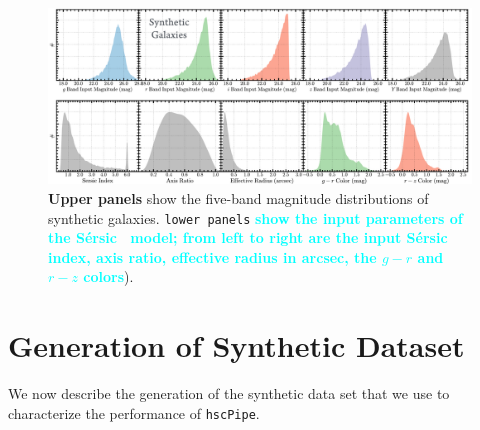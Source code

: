 \documentclass[useamsfonts]{pasj01}
\def\ser{{S\'{e}rsic\ }}
\def\hscpipe{\texttt{hscPipe}}
\newcommand{\song}[1]{\textcolor{cyan} {\textbf{#1}}}
\begin{document}
\begin{figure}
    \begin{center}
        \includegraphics[width=\textwidth]{fig/synpipe_galaxy_sample}
    \end{center}
    \caption{
         \textbf{Upper panels} show the five-band magnitude distributions of synthetic
         galaxies. \texttt{lower panels} \song{
         show the \textbf{input} parameters of the \ser{} 
         model; from left to right are the input \ser{} index, axis ratio, effective 
         radius in arcsec, the $g-r$ and $r-z$ colors}).
         }
    \label{fig:galaxy_sample}
\end{figure}

\section{Generation of Synthetic Dataset}
    \label{sec:test}
    
    We now describe the generation of the synthetic data set that we use to 
    characterize the performance of \hscpipe{}.

\end{document}
